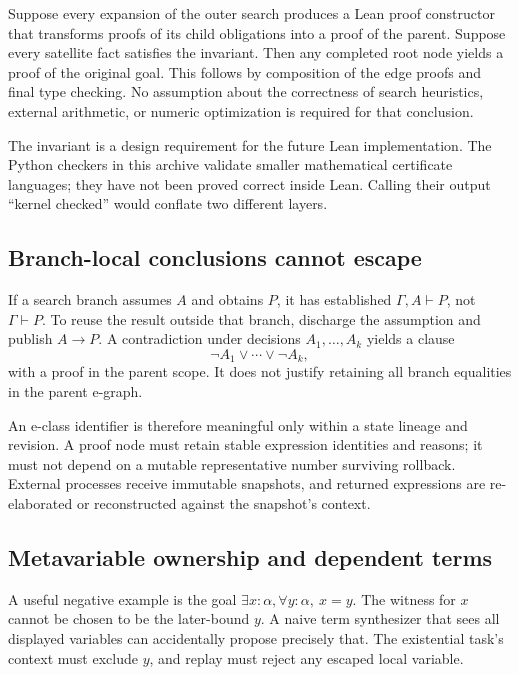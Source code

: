 \documentclass[11pt,a4paper]{article}
\newcommand{\ctx}{\Gamma}
\newcommand{\judg}[2]{#1\vdash #2}
\begin{document}
Suppose every expansion of the outer search produces a Lean proof constructor that transforms proofs of its child obligations into a proof of the parent. Suppose every satellite fact satisfies the invariant. Then any completed root node yields a proof of the original goal. This follows by composition of the edge proofs and final type checking. No assumption about the correctness of search heuristics, external arithmetic, or numeric optimization is required for that conclusion.

The invariant is a design requirement for the future Lean implementation. The Python checkers in this archive validate smaller mathematical certificate languages; they have not been proved correct inside Lean. Calling their output ``kernel checked'' would conflate two different layers.

\subsection{Branch-local conclusions cannot escape}

If a search branch assumes $A$ and obtains $P$, it has established $\judg{\ctx,A}{P}$, not $\judg{\ctx}{P}$. To reuse the result outside that branch, discharge the assumption and publish $A\to P$. A contradiction under decisions $A_1,\ldots,A_k$ yields a clause
\[
\neg A_1\lor\cdots\lor\neg A_k,
\]
with a proof in the parent scope. It does not justify retaining all branch equalities in the parent e-graph.

An e-class identifier is therefore meaningful only within a state lineage and revision. A proof node must retain stable expression identities and reasons; it must not depend on a mutable representative number surviving rollback. External processes receive immutable snapshots, and returned expressions are re-elaborated or reconstructed against the snapshot's context.

\subsection{Metavariable ownership and dependent terms}

A useful negative example is the goal $\exists x:\alpha,\forall y:\alpha,\ x=y$. The witness for $x$ cannot be chosen to be the later-bound $y$. A naive term synthesizer that sees all displayed variables can accidentally propose precisely that. The existential task's context must exclude $y$, and replay must reject any escaped local variable.
\end{document}
